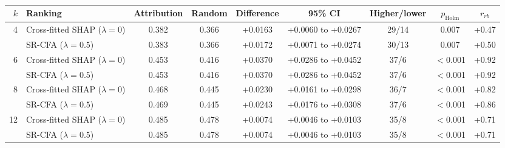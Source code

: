 \begin{table}[t]
\centering
\small
\caption{}
\label{tab:h2}
\setlength{\tabcolsep}{4pt}
\begin{adjustbox}{max width=\textwidth}
\begin{tabular}{rlccccccc}
\toprule
$k$ & Ranking & Attribution & Random & Difference & 95\% CI & Higher/lower & $p_{\mathrm{Holm}}$ & $r_{rb}$ \\
\midrule
4 & Cross-fitted SHAP ($\lambda = 0$) & 0.382 & 0.366 & +0.0163 & +0.0060 to +0.0267 & 29/14 & 0.007 & +0.47 \\
 & SR-CFA ($\lambda = 0.5$) & 0.383 & 0.366 & +0.0172 & +0.0071 to +0.0274 & 30/13 & 0.007 & +0.50 \\
\midrule 6 & Cross-fitted SHAP ($\lambda = 0$) & 0.453 & 0.416 & +0.0370 & +0.0286 to +0.0452 & 37/6 & $<$0.001 & +0.92 \\
 & SR-CFA ($\lambda = 0.5$) & 0.453 & 0.416 & +0.0370 & +0.0286 to +0.0452 & 37/6 & $<$0.001 & +0.92 \\
\midrule 8 & Cross-fitted SHAP ($\lambda = 0$) & 0.468 & 0.445 & +0.0230 & +0.0161 to +0.0298 & 36/7 & $<$0.001 & +0.82 \\
 & SR-CFA ($\lambda = 0.5$) & 0.469 & 0.445 & +0.0243 & +0.0176 to +0.0308 & 37/6 & $<$0.001 & +0.86 \\
\midrule 12 & Cross-fitted SHAP ($\lambda = 0$) & 0.485 & 0.478 & +0.0074 & +0.0046 to +0.0103 & 35/8 & $<$0.001 & +0.71 \\
 & SR-CFA ($\lambda = 0.5$) & 0.485 & 0.478 & +0.0074 & +0.0046 to +0.0103 & 35/8 & $<$0.001 & +0.71 \\
\bottomrule
\end{tabular}
\end{adjustbox}
\end{table}
